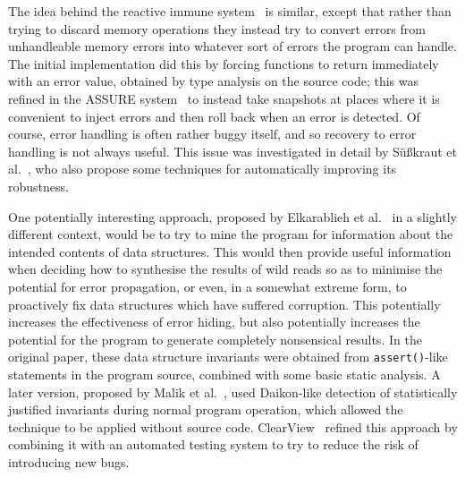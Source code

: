 The idea behind the reactive immune system~\cite{Sidiroglou2005} is
similar, except that rather than trying to discard memory operations
they instead try to convert errors from unhandleable memory errors
into whatever sort of errors the program can handle.  The initial
implementation did this by forcing functions to return immediately
with an error value, obtained by type analysis on the source code;
this was refined in the ASSURE system~\cite{Sidiroglou2009} to instead
take snapshots at places where it is convenient to inject errors and
then roll back when an error is detected.  Of course, error handling
is often rather buggy itself, and so recovery to error handling is not
always useful.  This issue was investigated in detail by
S\"{u}\ss{}kraut et al.~\cite{Susskraut2006}, who also propose some
techniques for automatically improving its robustness.

One potentially interesting approach, proposed by Elkarablieh et
al.~\cite{Elkarablieh2007} in a slightly different context, would be
to try to mine the program for information about the intended contents
of data structures.  This would then provide useful information when
deciding how to synthesise the results of wild reads so as to minimise
the potential for error propagation, or even, in a somewhat extreme
form, to proactively fix data structures which have suffered
corruption.  This potentially increases the effectiveness of error
hiding, but also potentially increases the potential for the program
to generate completely nonsensical results.  In the original paper,
these data structure invariants were obtained from
\verb|assert()|-like statements in the program source, combined with
some basic static analysis.  A later version, proposed by Malik et
al.~\cite{Malik}, used Daikon-like detection of statistically
justified invariants during normal program operation, which allowed
the technique to be applied without source code.
ClearView~\cite{Perkins} refined this approach by combining it with an
automated testing system to try to reduce the risk of introducing new
bugs.

